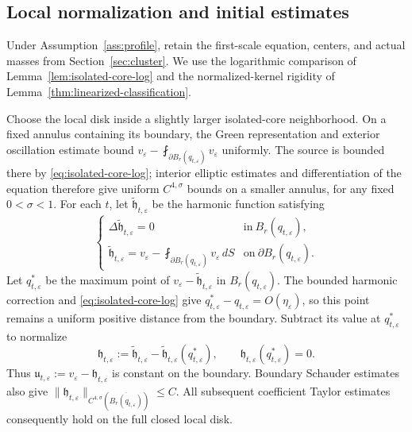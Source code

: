 \documentclass[11pt,reqno]{amsart}
\numberwithin{equation}{section}
\theoremstyle{definition}
\theoremstyle{remark}
\newcommand{\eps}{\varepsilon}
\newcommand{\etae}{\eta_{\eps}}
\begin{document}
\subsection{Local normalization and initial estimates}
\label{app:core-normalization}

Under Assumption~\ref{ass:profile}, retain the first-scale equation,
centers, and actual masses from Section~\ref{sec:cluster}. We use the
logarithmic comparison of Lemma~\ref{lem:isolated-core-log} and the
normalized-kernel rigidity of Lemma~\ref{thm:linearized-classification}.

Choose the local disk inside a slightly larger isolated-core
neighborhood. On a fixed annulus containing its boundary, the Green
representation and exterior oscillation estimate bound
$v_\eps-\fint_{\partial B_r(q_{t,\eps})}v_\eps$ uniformly.
The source is bounded there by \eqref{eq:isolated-core-log};
interior elliptic estimates and differentiation of the equation
therefore give uniform $C^{4,\sigma}$ bounds on a smaller annulus,
for any fixed $0<\sigma<1$.
For each $t$, let $\widetilde{\mathfrak h}_{t,\eps}$ be the harmonic function
satisfying
\begin{equation}
  \begin{cases}
  \Delta\widetilde{\mathfrak h}_{t,\eps}=0
  &\text{in} \ B_r(q_{t,\eps}),\\
  \displaystyle
  \widetilde{\mathfrak h}_{t,\eps}
  =v_\eps-\fint_{\partial B_r(q_{t,\eps})}v_\eps\,dS
  &\text{on}\ \partial B_r(q_{t,\eps}).
  \end{cases}
  \label{eq:harmonic-correction}
\end{equation}
Let $q_{t,\eps}^*$ be the maximum point of
$v_\eps-\widetilde{\mathfrak h}_{t,\eps}$ in $B_r(q_{t,\eps})$.
The bounded harmonic correction and \eqref{eq:isolated-core-log}
give $q_{t,\eps}^*-q_{t,\eps}=O(\etae)$, so this point remains a
uniform positive distance from the boundary. Subtract its value at
$q_{t,\eps}^*$ to normalize
\begin{equation}
  \mathfrak h_{t,\eps}
  :=\widetilde{\mathfrak h}_{t,\eps}
  -\widetilde{\mathfrak h}_{t,\eps}(q_{t,\eps}^*),
  \qquad
  \mathfrak h_{t,\eps}(q_{t,\eps}^*)=0.
  \label{eq:phi-normalization}
\end{equation}
Thus $\mathfrak u_{t,\eps}:=v_\eps-\mathfrak h_{t,\eps}$ is constant on the boundary.
Boundary Schauder estimates also give
$\|\mathfrak h_{t,\eps}\|_{C^{4,\sigma}(\overline{B_r(q_{t,\eps})})}\le C$.
All subsequent coefficient Taylor estimates consequently hold on the
full closed local disk.
\end{document}
